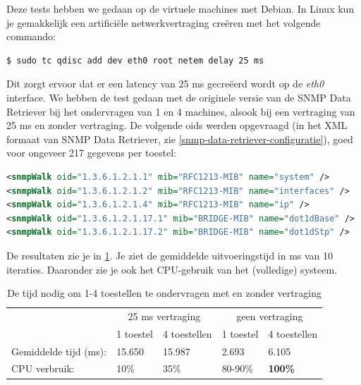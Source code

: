 Deze tests hebben we gedaan op de virtuele machines met Debian.
In Linux kun je gemakkelijk een artificiële netwerkvertraging creëren met het volgende commando:

\begin{lstlisting}[language=bash, caption={Artificiële netwerkvertraging van 25ms op de eth0 interface}]
$ sudo tc qdisc add dev eth0 root netem delay 25 ms
\end{lstlisting}

Dit zorgt ervoor dat er een latency van 25 ms gecreëerd wordt op de \textit{eth0} interface.
We hebben de test gedaan met de originele versie van de SNMP Data Retriever bij het ondervragen van 1 en 4 machines,
alsook bij een vertraging van 25 ms en zonder vertraging.
De volgende \glspl{oid} werden opgevraagd (in het XML formaat van SNMP Data Retriever, zie \cref{snmp-data-retriever-configuratie}),
goed voor ongeveer 217 gegevens per toestel:

\begin{lstlisting}[language=xml]
<snmpWalk oid="1.3.6.1.2.1.1" mib="RFC1213-MIB" name="system" />
<snmpWalk oid="1.3.6.1.2.1.2" mib="RFC1213-MIB" name="interfaces" />
<snmpWalk oid="1.3.6.1.2.1.4" mib="RFC1213-MIB" name="ip" />
<snmpWalk oid="1.3.6.1.2.1.17.1" mib="BRIDGE-MIB" name="dot1dBase" />
<snmpWalk oid="1.3.6.1.2.1.17.2" mib="BRIDGE-MIB" name="dot1dStp" />
\end{lstlisting}

De resultaten zie je in \cref{tabel-latency}.
Je ziet de gemiddelde uitvoeringstijd in ms van 10 iteraties.
Daaronder zie je ook het CPU-gebruik van het (volledige) systeem.

\begin{table}[h]
\centering
\begin{tabular}{@{}lllll@{}}
\toprule
                      & \multicolumn{2}{c}{25 ms vertraging} & \multicolumn{2}{c}{geen vertraging} \\
                      & 1 toestel       & 4 toestellen       & 1 toestel       & 4 toestellen      \\ \midrule
Gemiddelde tijd (ms): & 15.650          & 15.987             & 2.693           & 6.105             \\
CPU verbruik:         & 10\%            & 35\%               & 80-90\%         & \textbf{100\%}    \\ \bottomrule
\end{tabular}
\caption{De tijd nodig om 1-4 toestellen te ondervragen met en zonder vertraging}
\label{tabel-latency}
\end{table}

